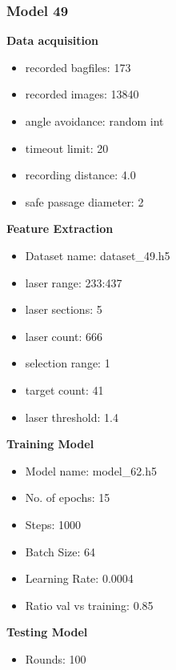 \subsubsection{Model 49\label{model_49} }
\begin{multicols}{2}\textbf{Data acquisition}
\begin{itemize}
\setlength\itemsep{0.1em}
\item recorded bagfiles: 173
\item recorded images: 13840
\item angle avoidance: random int
\item timeout limit: 20
\item recording distance: 4.0
\item safe passage diameter: 2
\end{itemize}
\textbf{Feature Extraction}
\begin{itemize}
\setlength\itemsep{0.1em}
\item Dataset name: dataset\_49.h5
\item  laser range: 233:437
\item  laser sections: 5
\item  laser count: 666
\item  selection range: 1
\item  target count: 41
\item  laser threshold: 1.4
\end{itemize}
\columnbreak
\textbf{Training Model}
\begin{itemize}
\setlength\itemsep{0.1em}
\item  Model name: model\_62.h5
\item  No. of epochs: 15
\item  Steps: 1000
\item  Batch Size: 64
\item  Learning Rate: 0.0004
\item  Ratio val vs training: 0.85
\end{itemize}
\textbf{Testing Model}
\begin{itemize}
\setlength\itemsep{0.1em}
\item Rounds: 100
\newline
\newline
\newline
\newline
\newline
\newline
\newline
\newline

\end{itemize}
\end{multicols}

